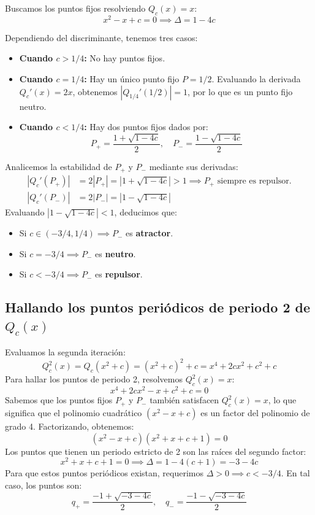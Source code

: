 Buscamos los puntos fijos resolviendo $Q_c(x) = x$:
$$ x^2 - x + c = 0 \implies \Delta = 1 - 4c $$

Dependiendo del discriminante, tenemos tres casos:
\begin{itemize}
	\item \textbf{Cuando $c > 1/4$:} No hay puntos fijos.
	\item \textbf{Cuando $c = 1/4$:} Hay un único punto fijo $P = 1/2$. Evaluando la derivada $Q_c'(x) = 2x$, obtenemos $|Q_{1/4}'(1/2)| = 1$, por lo que es un punto fijo neutro.
	\item \textbf{Cuando $c < 1/4$:} Hay dos puntos fijos dados por:
	$$ P_+ = \frac{1 + \sqrt{1-4c}}{2}, \quad P_- = \frac{1 - \sqrt{1-4c}}{2} $$
\end{itemize}

Analicemos la estabilidad de $P_+$ y $P_-$ mediante sus derivadas:
\begin{align*}
	|Q_c'(P_+)| &= 2|P_+| = |1 + \sqrt{1-4c}| > 1 \implies \text{$P_+$ siempre es repulsor}. \\
	|Q_c'(P_-)| &= 2|P_-| = |1 - \sqrt{1-4c}|
\end{align*}
Evaluando $|1 - \sqrt{1-4c}| < 1$, deducimos que:
\begin{itemize}
	\item Si $c \in (-3/4, 1/4) \implies P_-$ es \textbf{atractor}.
	\item Si $c = -3/4 \implies P_-$ es \textbf{neutro}.
	\item Si $c < -3/4 \implies P_-$ es \textbf{repulsor}.
\end{itemize}

\subsection*{Hallando los puntos periódicos de periodo 2 de \texorpdfstring{$Q_c(x)$}{Q\_c(x)}}

Evaluamos la segunda iteración:
$$ Q_c^2(x) = Q_c(x^2+c) = (x^2+c)^2 + c = x^4 + 2cx^2 + c^2 + c $$
Para hallar los puntos de periodo 2, resolvemos $Q_c^2(x) = x$:
$$ x^4 + 2cx^2 - x + c^2 + c = 0 $$
Sabemos que los puntos fijos $P_+$ y $P_-$ también satisfacen $Q_c^2(x) = x$, lo que significa que el polinomio cuadrático $(x^2 - x + c)$ es un factor del polinomio de grado 4. Factorizando, obtenemos:
$$ (x^2 - x + c)(x^2 + x + c + 1) = 0 $$
Los puntos que tienen un periodo estricto de 2 son las raíces del segundo factor:
$$ x^2 + x + c + 1 = 0 \implies \Delta = 1 - 4(c+1) = -3 - 4c $$
Para que estos puntos periódicos existan, requerimos $\Delta > 0 \implies c < -3/4$. En tal caso, los puntos son:
$$ q_+ = \frac{-1 + \sqrt{-3-4c}}{2}, \quad q_- = \frac{-1 - \sqrt{-3-4c}}{2} $$


